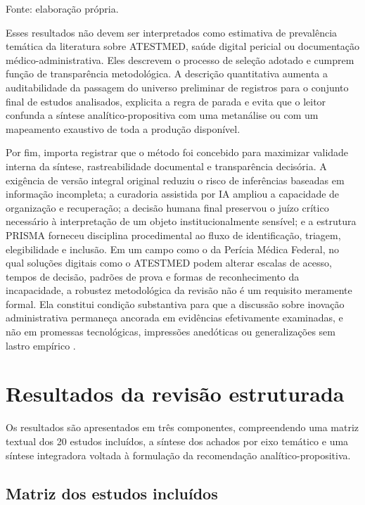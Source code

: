 \documentclass[12pt,a4paper]{article}
\begin{document}
Fonte: elaboração própria.

Esses resultados não devem ser interpretados como estimativa de prevalência temática da literatura sobre ATESTMED, saúde digital pericial ou documentação médico-administrativa. Eles descrevem o processo de seleção adotado e cumprem função de transparência metodológica. A descrição quantitativa aumenta a auditabilidade da passagem do universo preliminar de registros para o conjunto final de estudos analisados, explicita a regra de parada e evita que o leitor confunda a síntese analítico-propositiva com uma metanálise ou com um mapeamento exaustivo de toda a produção disponível.

Por fim, importa registrar que o método foi concebido para maximizar validade interna da síntese, rastreabilidade documental e transparência decisória. A exigência de versão integral original reduziu o risco de inferências baseadas em informação incompleta; a curadoria assistida por IA ampliou a capacidade de organização e recuperação; a decisão humana final preservou o juízo crítico necessário à interpretação de um objeto institucionalmente sensível; e a estrutura PRISMA forneceu disciplina procedimental ao fluxo de identificação, triagem, elegibilidade e inclusão. Em um campo como o da Perícia Médica Federal, no qual soluções digitais como o ATESTMED podem alterar escalas de acesso, tempos de decisão, padrões de prova e formas de reconhecimento da incapacidade, a robustez metodológica da revisão não é um requisito meramente formal. Ela constitui condição substantiva para que a discussão sobre inovação administrativa permaneça ancorada em evidências efetivamente examinadas, e não em promessas tecnológicas, impressões anedóticas ou generalizações sem lastro empírico \parencite{soares20241031t0000000000asistematicadoatestmednaconcessa, ftouni2022challengesoftelemedicineduringthecovid19pandemica, gabbay2011niceguidanceonlongtermsicknessandincapacity}.

\section{Resultados da revisão estruturada}
\label{sec:orgf5bcabc}
Os resultados são apresentados em três componentes, compreendendo uma matriz textual dos 20 estudos incluídos, a síntese dos achados por eixo temático e uma síntese integradora voltada à formulação da recomendação analítico-propositiva.

\subsection{Matriz dos estudos incluídos}
\label{sec:org1ee6c26}
\end{document}
